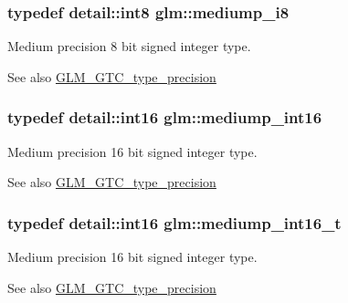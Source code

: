 \subsubsection[{mediump\+\_\+i8}]{\setlength{\rightskip}{0pt plus 5cm}typedef detail\+::int8 {\bf glm\+::mediump\+\_\+i8}}\label{group__gtc__type__precision_ga28a8b5fd51072680bb55178c17cc7411}
Medium precision 8 bit signed integer type. \begin{DoxySeeAlso}{See also}
\hyperlink{group__gtc__type__precision}{G\+L\+M\+\_\+\+G\+T\+C\+\_\+type\+\_\+precision} 
\end{DoxySeeAlso}
\hypertarget{group__gtc__type__precision_ga4611997edb6c61606daa11990cf08798}{}
\subsubsection[{mediump\+\_\+int16}]{\setlength{\rightskip}{0pt plus 5cm}typedef {\bf detail\+::int16} {\bf glm\+::mediump\+\_\+int16}}\label{group__gtc__type__precision_ga4611997edb6c61606daa11990cf08798}
Medium precision 16 bit signed integer type. \begin{DoxySeeAlso}{See also}
\hyperlink{group__gtc__type__precision}{G\+L\+M\+\_\+\+G\+T\+C\+\_\+type\+\_\+precision} 
\end{DoxySeeAlso}
\hypertarget{group__gtc__type__precision_ga478fab608cf43040013d719a3e03b194}{}
\subsubsection[{mediump\+\_\+int16\+\_\+t}]{\setlength{\rightskip}{0pt plus 5cm}typedef {\bf detail\+::int16} {\bf glm\+::mediump\+\_\+int16\+\_\+t}}\label{group__gtc__type__precision_ga478fab608cf43040013d719a3e03b194}
Medium precision 16 bit signed integer type. \begin{DoxySeeAlso}{See also}
\hyperlink{group__gtc__type__precision}{G\+L\+M\+\_\+\+G\+T\+C\+\_\+type\+\_\+precision} 
\end{DoxySeeAlso}
\hypertarget{group__gtc__type__precision_ga0660a752402702f420f13c686a7fff29}{}
